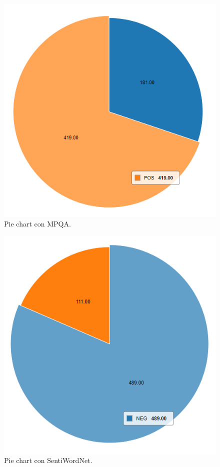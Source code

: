 \begin{figure}[t]
    \center\includegraphics[width=.95\linewidth]{img/analysis/pie1.png}
    \caption{Pie chart con MPQA.}
\end{figure}

\begin{figure}[t]
    \center\includegraphics[width=.95\linewidth]{img/analysis/pie2.png}
    \caption{Pie chart con SentiWordNet.}
\end{figure}

